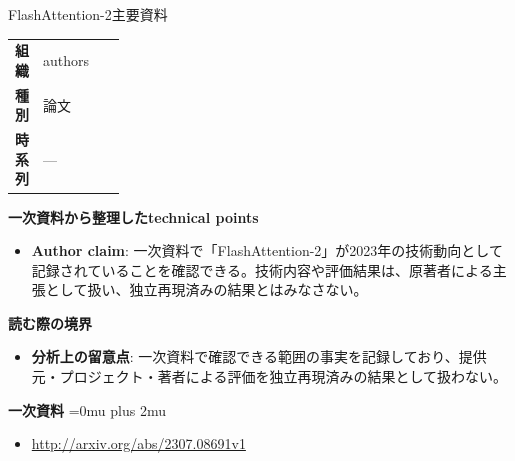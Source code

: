 \begin{technicalnote}{FlashAttention-2}{主要資料}
\begingroup
\begin{tabularx}{\linewidth}{@{}>{\bfseries}p{0.22\linewidth}X@{}}
組織 & authors \\
種別 & 論文 \\
時系列 & — \\
\end{tabularx}
\smallskip
{\bfseries 一次資料から整理したtechnical points}
\begin{itemize}[leftmargin=1.5em,itemsep=0.35em]
\item \textbf{Author claim}: 一次資料で「FlashAttention-2」が2023年の技術動向として記録されていることを確認できる。技術内容や評価結果は、原著者による主張として扱い、独立再現済みの結果とはみなさない。
\end{itemize}
\begin{minipage}{\linewidth}
{\bfseries 読む際の境界}
\begin{itemize}[leftmargin=1.5em,itemsep=0.35em]
\item \textbf{分析上の留意点}: 一次資料で確認できる範囲の事実を記録しており、提供元・プロジェクト・著者による評価を独立再現済みの結果として扱わない。
\end{itemize}
\begin{samepage}
{\bfseries 一次資料}
\begingroup\sloppy
\Urlmuskip=0mu plus 2mu\relax
\begin{itemize}[leftmargin=1.5em,itemsep=0.25em]
\item {\scriptsize\url{http://arxiv.org/abs/2307.08691v1}}
\end{itemize}
\endgroup
\end{samepage}
\end{minipage}
\endgroup
\end{technicalnote}
\medskip


